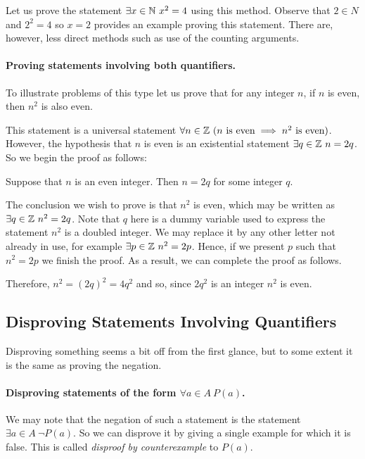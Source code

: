 Let us prove the statement $\exists x \in \mathbb{N} \ x^2 = 4$ using this method.
Observe that $2 \in N$ and $2^2 = 4$ so $x = 2$ provides an example proving
this statement. There are, however, less direct methods such as use of the
counting arguments.

\paragraph{Proving statements involving both quantifiers.}
To illustrate problems of this type let us prove that for any integer $n$, if
$n$ is even, then $n^2$ is also even.

This statement is a universal statement $\forall n \in \mathbb{Z} \ (n \text{ is even}
\implies n^2 \text{ is even})$. However, the hypothesis that $n$ is even is an
existential statement $\exists q \in \mathbb{Z} \ n = 2q$. So we begin the proof as
follows:
\begin{center}
  Suppose that $n$ is an even integer. Then $n = 2q$ for some integer $q$.
\end{center}
The conclusion we wish to prove is that $n^2$ is even, which may be written as
$\exists q \in \mathbb{Z} \ n^2 = 2q$. Note that $q$ here is a dummy variable used to
express the statement $n^2$ is a doubled integer. We may replace it by any
other letter not already in use, for example $\exists p \in \mathbb{Z} \ n^2 = 2p$.
Hence, if we present $p$ such that $n^2 = 2p$ we finish the proof. As a result,
we can complete the proof as follows.
\begin{center}
  Therefore, $n^2 = (2q)^2 = 4q^2$ and so, since $2q^2$ is an integer $n^2$ is
  even.
\end{center}

\subsection{Disproving Statements Involving Quantifiers}
Disproving something seems a bit off from the first glance, but to some extent
it is the same as proving the negation.

\paragraph{Disproving statements of the form $\forall a \in A \ P(a)$.}
We may note that the negation of such a statement is the statement $\exists a
\in A \ \lnot P(a)$. So we can disprove it by giving a single example for which
it is false. This is called \emph{disproof by counterexample} to $P(a)$.

